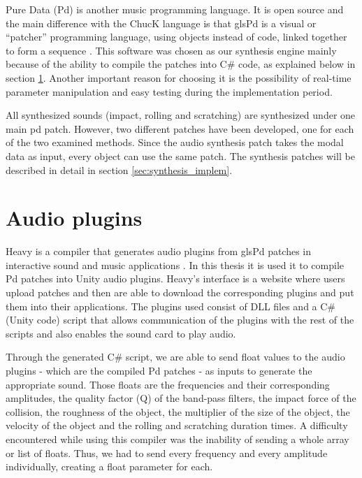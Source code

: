 Pure Data (Pd) is another music programming language. It is open source and the main difference with the ChucK language is that gls{Pd} is a visual or ``patcher'' programming language, using objects instead of code, linked together to form a sequence \cite{bib:pd}. This software was chosen as our synthesis engine mainly because of the ability to compile the patches into C\# code, as explained below in section \ref{sec:heavy}. Another important reason for choosing it is the possibility of real-time parameter manipulation and easy testing during the implementation period.

All synthesized sounds (impact, rolling and scratching) are synthesized under one main pd patch. However, two different patches have been developed, one for each of the two examined methods. Since the audio synthesis patch takes the modal data as input, every object can use the same patch. The synthesis patches will be described in detail in section \ref{sec:synthesis_implem}.



\section{Audio plugins}\label{sec:heavy}

Heavy is a compiler that generates audio plugins from gls{Pd} patches in interactive sound and music applications \cite{bib:heavy}. In this thesis it is used it to compile \gls{Pd} patches into Unity\textsuperscript{\textregistered} audio plugins. Heavy's interface is a website where users upload patches and then are able to download the corresponding plugins and put them into their applications. The plugins used consist of DLL files and a C\# (Unity\textsuperscript{\textregistered} code) script that allows communication of the plugins with the rest of the scripts and also enables the sound card to play audio.

Through the generated C\# script, we are able to send float values to the audio plugins - which are the compiled Pd patches - as inputs to generate the appropriate sound. Those floats are the frequencies and their corresponding amplitudes, the quality factor (\gls{Q}) of the band-pass filters, the impact force of the collision, the roughness of the object, the multiplier of the size of the object, the velocity of the object and the rolling and scratching duration times. A difficulty encountered while using this compiler was the inability of sending a whole array or list of floats. Thus, we had to send every frequency and every amplitude individually, creating a float parameter for each.
 
